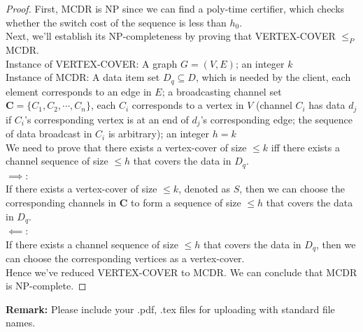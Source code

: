 \documentclass[12pt,a4paper]{article}
\theoremstyle{definition}
\begin{document}
\begin{enumerate}
	\begin{proof}
        First, MCDR is NP since we can find a poly-time certifier, which checks whether the switch cost of the sequence is less than $h_0$. \\
        Next, we'll establish its NP-completeness by proving that VERTEX-COVER $\leq _P$ MCDR. \\
        Instance of VERTEX-COVER: A graph $G = (V, E)$; an integer $k$ \\
        Instance of MCDR: A data item set $D_q \subseteq D$, which is needed by the client, each element corresponds to an edge in $E$; a broadcasting channel set $\mathbf{C}=\{C_1, C_2, \cdots, C_n\}$, each $C_i$ corresponds to a vertex in $V$ (channel $C_i$ has data $d_j$ if $C_i$'s corresponding vertex is at an end of $d_j$'s corresponding edge; the sequence of data broadcast in $C_i$ is arbitrary); an integer $h = k$ \\
        We need to prove that there exists a vertex-cover of size $\leq k$ iff there exists a channel sequence of size $\leq h$ that covers the data in $D_q$. \\
        $\implies$: \\
        If there exists a vertex-cover of size $\leq k$, denoted as $S$, then we can choose the corresponding channels in $\mathbf{C}$ to form a sequence of size $\leq h$ that covers the data in $D_q$. \\
        $\impliedby$: \\
        If there exists a channel sequence of size $\leq h$ that covers the data in $D_q$, then we can choose the corresponding vertices as a vertex-cover. \\
        Hence we've reduced VERTEX-COVER to MCDR. We can conclude that MCDR is NP-complete.
    \end{proof}

\end{enumerate}

\textbf{Remark:} Please include your .pdf, .tex files for uploading with standard file names.




\end{document}
